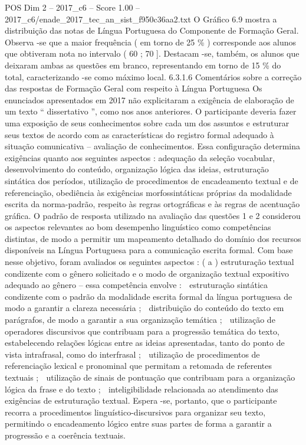 \begin{textsample}{POS Dim 2 – 2017\_c6 – Score 1.00 – 2017\_c6/enade\_2017\_tec\_an\_sist\_f950c36aa2.txt}
O Gráfico 6.9 mostra a distribuição das notas de Língua Portuguesa do Componente de Formação Geral.
Observa -se que a maior frequência ( em torno de 25 \% ) corresponde aos alunos que obtiveram nota no intervalo ( 60 ; 70 ].
Destacam -se, também, os alunos que deixaram ambas as questões em branco, representando em torno de 15 \% do total, caracterizando -se como máximo local. 6.3.1.6 Comentários sobre a correção das respostas de Formação Geral com respeito à Língua Portuguesa Os enunciados apresentados em 2017 não explicitaram a exigência de elaboração de um texto “ dissertativo ”, como nos anos anteriores.
O participante deveria fazer uma exposição de seus conhecimentos sobre cada um dos assuntos e estruturar seus textos de acordo com as características do registro formal adequado à situação comunicativa – avaliação de conhecimentos.
Essa configuração determina exigências quanto aos seguintes aspectos : adequação da seleção vocabular, desenvolvimento do conteúdo, organização lógica das ideias, estruturação sintática dos períodos, utilização de procedimentos de encadeamento textual e de referenciação, obediência às exigências morfossintáticas próprias da modalidade escrita da norma-padrão, respeito às regras ortográficas e às regras de acentuação gráfica.
O padrão de resposta utilizado na avaliação das questões 1 e 2 considerou os aspectos relevantes ao bom desempenho linguístico como competências distintas, de modo a permitir um mapeamento detalhado do domínio dos recursos disponíveis na Língua Portuguesa para a comunicação escrita formal.
Com base nesse objetivo, foram avaliados os seguintes aspectos : ( a ) estruturação textual condizente com o gênero solicitado e o modo de organização textual expositivo adequado ao gênero – essa competência envolve :  estruturação sintática condizente com o padrão da modalidade escrita formal da língua portuguesa de modo a garantir a clareza necessária ;  distribuição do conteúdo do texto em parágrafos, de modo a garantir a sua organização temática ;  utilização de operadores discursivos que contribuam para a progressão temática do texto, estabelecendo relações lógicas entre as ideias apresentadas, tanto do ponto de vista intrafrasal, como do interfrasal ;  utilização de procedimentos de referenciação lexical e pronominal que permitam a retomada de referentes textuais ;  utilização de sinais de pontuação que contribuam para a organização lógica da frase e do texto ;  inteligibilidade relacionada ao atendimento das exigências de estruturação textual.
Espera -se, portanto, que o participante recorra a procedimentos linguístico-discursivos para organizar seu texto, permitindo o encadeamento lógico entre suas partes de forma a garantir a progressão e a coerência textuais.

\end{textsample}
